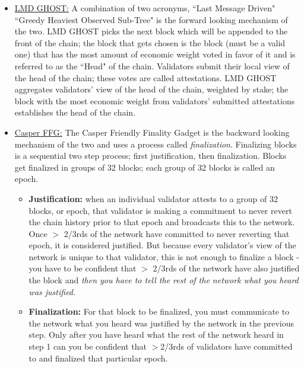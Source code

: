 \documentclass[12pt]{article}
\begin{document}
\begin{itemize}
    \item \href{https://eth2book.info/capella/part2/consensus/lmd_ghost/}{LMD GHOST:}  A combination of two acronyms, ``Last Message Driven" ``Greedy Heaviest Observed Sub-Tree" is the forward looking mechanism of the two. LMD GHOST picks the next block which will be appended to the front of the chain; the block that gets chosen is the block (must be a valid one) that has the most amount of economic weight voted in favor of it and is referred to as the ``Head" of the chain. Validators submit their local view of the head of the chain; these votes are called attestations. LMD GHOST aggregates validators' view of the head of the chain, weighted by stake; the block with the most economic weight from validators' submitted attestations establishes the head of the chain. 
    \item \href{https://eth2book.info/capella/part2/consensus/casper_ffg/}{Casper FFG:} The Casper Friendly Finality Gadget is the backward looking mechanism of the two and uses a process called \textit{finalization}. Finalizing blocks is a sequential two step process; first justification, then finalization. Blocks get finalized in groups of 32 blocks; each group of 32 blocks is called an epoch. 

    \begin{itemize}
        \item \textbf{Justification:} when an individual validator attests to a group of 32 blocks, or epoch, that validator is making a commitment to never revert the chain history prior to that epoch and broadcasts this to the network. Once $>$ 2/3rds of the network have committed to never reverting that epoch, it is considered justified. But because every validator's view of the network is unique to that validator, this is not enough to finalize a block - you have to be confident that $>$ 2/3rds of the network have also justified the block and \textit{then you have to tell the rest of the network what you heard was justified.}
        \item \textbf{Finalization:} For that block to be finalized, you must communicate to the network what you heard was justified by the network in the previous step. Only after you have heard what the rest of the network heard in step 1 can you be confident that $>$2/3rds of validators have committed to and finalized that particular epoch.
    \end{itemize}
\end{itemize} 
\label{Finality}
\end{document}
